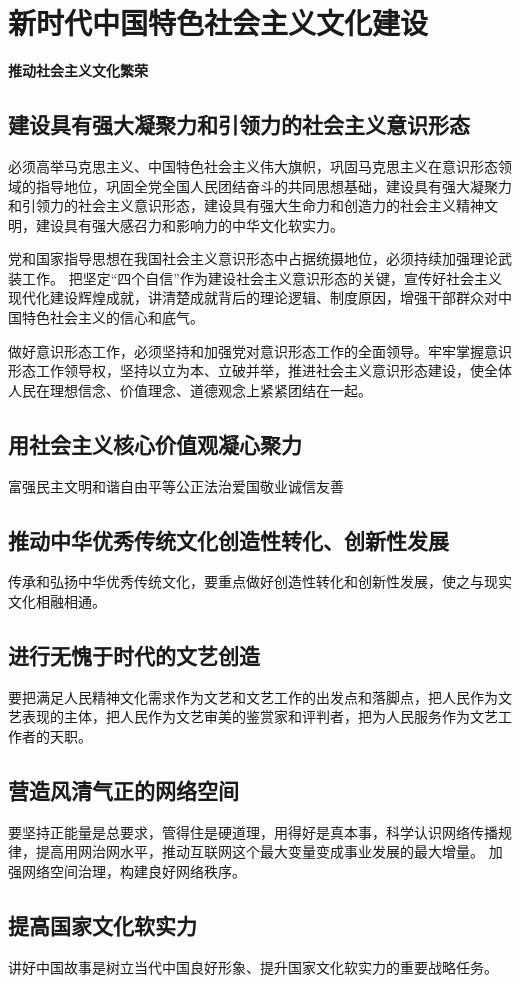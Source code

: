 \documentclass[a4paper, UTF8]{ctexart}
\begin{document}
\section{新时代中国特色社会主义文化建设}
    \textbf{推动社会主义文化繁荣}
    
    \subsection{建设具有强大凝聚力和引领力的社会主义意识形态}
    必须高举马克思主义、中国特色社会主义伟大旗帜，巩固马克思主义在意识形态领域的指导地位，巩固全党全国人民团结奋斗的共同思想基础，建设具有强大凝聚力和引领力的社会主义意识形态，建设具有强大生命力和创造力的社会主义精神文明，建设具有强大感召力和影响力的中华文化软实力。

    党和国家指导思想在我国社会主义意识形态中占据统摄地位，必须持续加强理论武装工作。
    把坚定“四个自信”作为建设社会主义意识形态的关键，宣传好社会主义现代化建设辉煌成就，讲清楚成就背后的理论逻辑、制度原因，增强干部群众对中国特色社会主义的信心和底气。

    做好意识形态工作，必须坚持和加强党对意识形态工作的全面领导。牢牢掌握意识形态工作领导权，坚持以立为本、立破并举，推进社会主义意识形态建设，使全体人民在理想信念、价值理念、道德观念上紧紧团结在一起。

    \subsection{用社会主义核心价值观凝心聚力}
    富强民主文明和谐自由平等公正法治爱国敬业诚信友善

    \subsection{推动中华优秀传统文化创造性转化、创新性发展}
    传承和弘扬中华优秀传统文化，要重点做好创造性转化和创新性发展，使之与现实文化相融相通。

    \subsection{进行无愧于时代的文艺创造}
    要把满足人民精神文化需求作为文艺和文艺工作的出发点和落脚点，把人民作为文艺表现的主体，把人民作为文艺审美的鉴赏家和评判者，把为人民服务作为文艺工作者的天职。

    \subsection{营造风清气正的网络空间}
    要坚持正能量是总要求，管得住是硬道理，用得好是真本事，科学认识网络传播规律，提高用网治网水平，推动互联网这个最大变量变成事业发展的最大增量。
    加强网络空间治理，构建良好网络秩序。

    \subsection{提高国家文化软实力}
    讲好中国故事是树立当代中国良好形象、提升国家文化软实力的重要战略任务。
\end{document}
